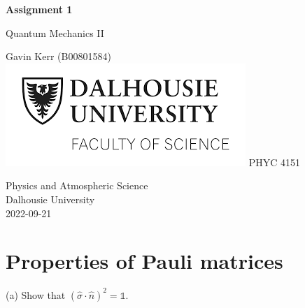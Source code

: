 \documentclass[12pt, a4paper]{article}
\begin{document}
\begin{titlepage}
   \begin{center}
       \vspace*{0.5cm}

       \LARGE{\textbf{Assignment 1}}

       \vspace{1cm}
        \Large{Quantum Mechanics II}
            
       \vspace{1cm}
		\small{Gavin Kerr (B00801584)} \\
		\vfill
		\includegraphics[scale=0.65]{dal_logo2.png}
       \vfill
           \large{PHYC 4151}
            
       \vspace{0.8cm}
     
            
       Physics and Atmospheric Science\\
       Dalhousie University\\
       2022-09-21
            
   \end{center}
\end{titlepage}




\section{Properties of Pauli matrices}
(a) Show that $(\hat{\sigma}\cdot\hat{n})^2 = \mathds{1}$.
\end{document}
